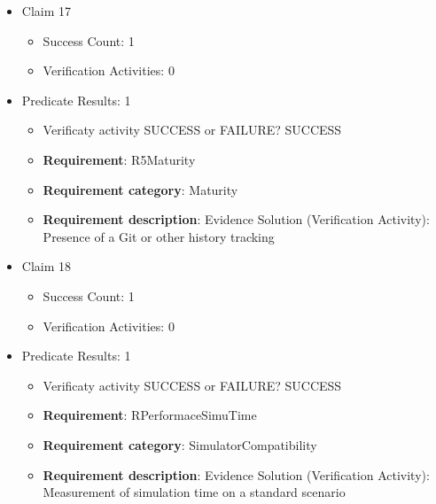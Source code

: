 \documentclass{article}
\begin{document}
\begin{itemize}
\begin{itemize}
					\item \textbf{Requirement}: R4Verification 
					\item \textbf{Requirement category}: ModelVerification
					\item \textbf{Requirement description}: Evidence Solution (Verification Activity): Report generation with Unit Tests or Equivalent
					\end{itemize}

  				  \item Claim 17
				\begin{itemize}
			    	\item Success Count: 1 
			    	\item Verification Activities: 0
				\end{itemize}
				
									    
				\item Predicate Results: 1
					\begin{itemize}				
					\item Verificaty activity SUCCESS or FAILURE? SUCCESS
					
					\item \textbf{Requirement}: R5Maturity 
					\item \textbf{Requirement category}: Maturity
					\item \textbf{Requirement description}: Evidence Solution (Verification Activity): Presence of a Git or other history tracking
					\end{itemize}

  				  \item Claim 18
				\begin{itemize}
			    	\item Success Count: 1 
			    	\item Verification Activities: 0
				\end{itemize}
				
									    
				\item Predicate Results: 1
					\begin{itemize}				
					\item Verificaty activity SUCCESS or FAILURE? SUCCESS
					
					\item \textbf{Requirement}: RPerformaceSimuTime 
					\item \textbf{Requirement category}: SimulatorCompatibility
					\item \textbf{Requirement description}: Evidence Solution (Verification Activity): Measurement of simulation time on a standard scenario
					\end{itemize}


\end{itemize}
\end{document}
